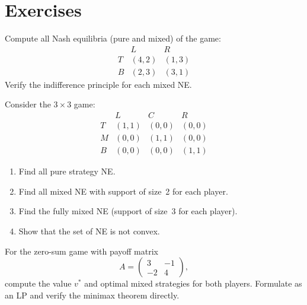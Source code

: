 \documentclass[11pt,a4paper]{article}
\begin{document}

\section{Exercises}
\label{sec:exercises}

\begin{exercise}
\label{ex:mixed_ne_compute}
Compute all Nash equilibria (pure and mixed) of the game:
\[
\begin{array}{c|cc}
 & L & R \\ \hline
T & (4,2) & (1,3) \\
B & (2,3) & (3,1)
\end{array}
\]
Verify the indifference principle for each mixed NE.
\end{exercise}

\begin{exercise}
\label{ex:support_enum}
Consider the $3 \times 3$ game:
\[
\begin{array}{c|ccc}
 & L & C & R \\ \hline
T & (1,1) & (0,0) & (0,0) \\
M & (0,0) & (1,1) & (0,0) \\
B & (0,0) & (0,0) & (1,1)
\end{array}
\]
\begin{enumerate}[nosep,label=(\alph*)]
    \item Find all pure strategy NE.
    \item Find all mixed NE with support of size~2 for each player.
    \item Find the fully mixed NE (support of size~3 for each player).
    \item Show that the set of NE is not convex.
\end{enumerate}
\end{exercise}

\begin{exercise}
\label{ex:minimax_compute}
For the zero-sum game with payoff matrix
\[
    A = \begin{pmatrix} 3 & -1 \\ -2 & 4 \end{pmatrix},
\]
compute the value $v^*$ and optimal mixed strategies for both players.
Formulate as an LP and verify the minimax theorem directly.
\end{exercise}
\end{document}
